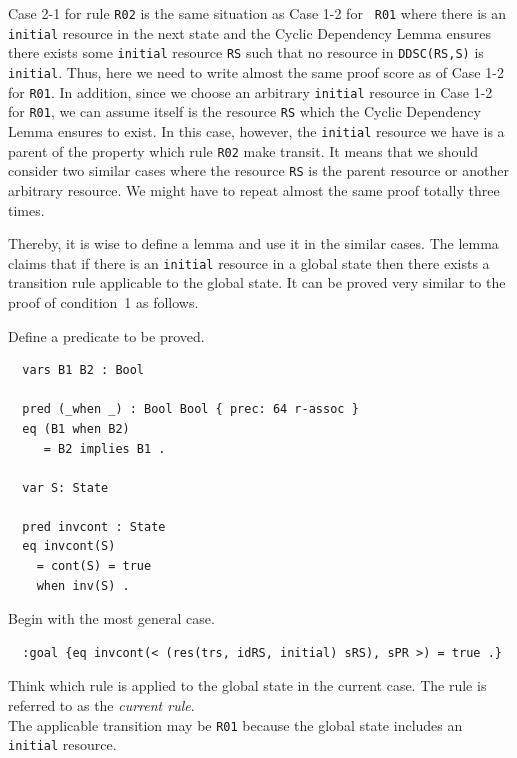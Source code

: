\documentclass[12pt]{report}
\newcommand{\stt}[1]{{\small{\tt {#1}}}}
\begin{document}
Case 2-1 for rule {\tt R02} is the same situation as Case 1-2 for {\tt
  R01} where there is an {\tt initial} resource in the next state and
the Cyclic Dependency Lemma ensures there exists some {\tt initial}
resource {\tt RS} such that no resource in \stt{DDSC(RS,S)} is {\tt
  initial}. Thus, here we need to write almost the same proof score as
of Case 1-2 for {\tt R01}. In addition, since we choose an arbitrary
{\tt initial} resource in Case 1-2 for {\tt R01}, we can assume itself
is the resource {\tt RS} which the Cyclic Dependency Lemma ensures to
exist. In this case, however, the {\tt initial} resource we have is
a parent of the property which rule {\tt R02} make transit. It means
that we should consider two similar cases where the resource {\tt RS}
is the parent resource or another arbitrary resource. We might have 
to repeat almost the same proof totally three times.

Thereby, it is wise to define a lemma and use it in the similar cases.
The lemma claims that if there is an {\tt initial} resource in a
global state then there exists a transition rule applicable to the
global state. It can be proved very similar to the proof of
condition~1 as follows.

 Define a predicate to be proved.
\small
\begin{verbatim}
  vars B1 B2 : Bool

  pred (_when _) : Bool Bool { prec: 64 r-assoc }
  eq (B1 when B2)
     = B2 implies B1 .

  var S: State

  pred invcont : State
  eq invcont(S) 
    = cont(S) = true
    when inv(S) .
\end{verbatim}
\normalsize
 Begin with the most general case.
\small
\begin{verbatim}
  :goal {eq invcont(< (res(trs, idRS, initial) sRS), sPR >) = true .}
\end{verbatim}
\normalsize
 Think which rule is applied to the global
state in the current case. The rule is referred to as the {\it current
rule}.\\
The applicable transition may be {\tt R01} because the global state
includes an {\tt initial} resource.\\
\end{document}
